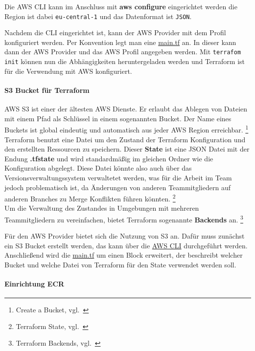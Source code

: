 Die AWS CLI kann im Anschluss mit \textbf{aws configure} eingerichtet werden die Region ist dabei \texttt{eu-central-1} und das Datenformat ist \texttt{JSON}.

Nachdem die CLI eingerichtet ist, kann der AWS Provider mit dem Profil konfiguriert werden.
Per Konvention legt man eine \hyperref[lst:terraform_main]{main.tf} an.
In dieser kann dann der AWS Provider und das AWS Profil angegeben werden.
Mit \texttt{terrafom init} können nun die Abhängigkeiten heruntergeladen werden und Terraform ist für die Verwendung mit AWS konfiguriert.

\paragraph{S3 Bucket für Terraform}

AWS S3 ist einer der ältesten AWS Dienste.
Er erlaubt das Ablegen von Dateien mit einem Pfad als Schlüssel in einem sogenannten Bucket.
Der Name eines Buckets ist global eindeutig und automatisch aus jeder AWS Region erreichbar.
\footnote{Create a Bucket, vgl.~\cite{AWS_S3}} \\

Terraform benutzt eine Datei um den Zustand der Terraform Konfiguration und den erstellten Ressourcen zu speichern.
Dieser \textbf{State} ist eine JSON Datei mit der Endung \textbf{.tfstate} und wird standardmäßig im gleichen Ordner wie die Konfiguration abgelegt.
Diese Datei könnte also auch über das Versionsverwaltungssystem verwaltetet werden,
was für die Arbeit im Team jedoch problematisch ist, da Änderungen von anderen Teammitgliedern auf anderen Branches zu Merge Konflikten führen könnten.
\footnote{Terraform State, vgl.~\cite{TERRAFORM_STATE}} \\

Um die Verwaltung des Zustandes in Umgebungen mit mehreren Teammitgliedern zu vereinfachen, bietet Terraform sogenannte \textbf{Backends} an.
\footnote{Terraform Backends, vgl.~\cite{TERRAFORM_BACKENDS}}

Für den AWS Provider bietet sich die Nutzung von S3 an.
Dafür muss zunächst ein S3 Bucket erstellt werden, das kann über die \hyperref[lst:terraform_s3_backend]{AWS CLI} durchgeführt werden.
Anschließend wird die \hyperref[lst:terraform_main]{main.tf} um einen Block erweitert, der beschreibt welcher Bucket und welche Datei von Terraform für den State verwendet werden soll.


\paragraph{Einrichtung ECR}

